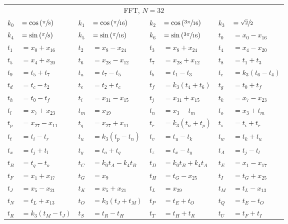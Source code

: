 \begin{tabular}{|p{4.3pt}l|p{4.3pt}l|p{4.3pt}l|p{4.3pt}l|}\toprule \multicolumn{8}{|c|}{FFT, $N=32$} \\
$k_0 $ &$= \cos\left(\sfrac{\pi}{8}\right)$ & $k_1 $ &$= \cos\left(\sfrac{\pi}{16}\right)$ & $k_2 $ &$= \cos\left(\sfrac{3\pi}{16}\right)$ & $k_3 $ &$= \sfrac{\sqrt{2}}{2}$\\ 
$k_4 $ &$= \sin\left(\sfrac{\pi}{8}\right)$ & $k_5 $ &$= \sin\left(\sfrac{\pi}{16}\right)$ & $k_6 $ &$= \sin\left(\sfrac{3\pi}{16}\right)$ & $t_0 $ &$= x_0 - x_{16}$\\ 
$t_1 $ &$= x_0 + x_{16}$ & $t_2 $ &$= x_8 - x_{24}$ & $t_3 $ &$= x_8 + x_{24}$ & $t_4 $ &$= x_4 - x_{20}$\\ 
$t_5 $ &$= x_4 + x_{20}$ & $t_6 $ &$= x_{28} - x_{12}$ & $t_7 $ &$= x_{28} + x_{12}$ & $t_8 $ &$= t_1 + t_3$\\ 
$t_9 $ &$= t_5 + t_7$ & $t_a $ &$= t_7 - t_5$ & $t_b $ &$= t_1 - t_3$ & $t_c $ &$= k_3(t_6 - t_4)$\\ 
$t_d $ &$= t_c - t_2$ & $t_e $ &$= t_2 + t_c$ & $t_f $ &$= k_3(t_4 + t_6)$ & $t_g $ &$= t_0 + t_f$\\ 
$t_h $ &$= t_0 - t_f$ & $t_i $ &$= x_{31} - x_{15}$ & $t_j $ &$= x_{31} + x_{15}$ & $t_k $ &$= x_7 - x_{23}$\\ 
$t_l $ &$= x_7 + x_{23}$ & $t_m $ &$= x_{19}$ & $t_n $ &$= x_3 - t_m$ & $t_o $ &$= x_3 + t_m$\\ 
$t_p $ &$= x_{27} - x_{11}$ & $t_q $ &$= x_{27} + x_{11}$ & $t_r $ &$= k_3(t_n + t_p)$ & $t_s $ &$= t_i + t_r$\\ 
$t_t $ &$= t_i - t_r$ & $t_u $ &$= k_3(t_p - t_n)$ & $t_v $ &$= t_u - t_k$ & $t_w $ &$= t_k + t_u$\\ 
$t_x $ &$= t_j + t_l$ & $t_y $ &$= t_o + t_q$ & $t_z $ &$= t_x - t_y$ & $t_A $ &$= t_j - t_l$\\ 
$t_B $ &$= t_q - t_o$ & $t_C $ &$= k_0t_A - k_4t_B$ & $t_D $ &$= k_0t_B + k_4t_A$ & $t_E $ &$= x_1 - x_{17}$\\ 
$t_F $ &$= x_1 + x_{17}$ & $t_G $ &$= x_9$ & $t_H $ &$= t_G - x_{25}$ & $t_I $ &$= t_G + x_{25}$\\ 
$t_J $ &$= x_5 - x_{21}$ & $t_K $ &$= x_5 + x_{21}$ & $t_L $ &$= x_{29}$ & $t_M $ &$= t_L - x_{13}$\\ 
$t_N $ &$= t_L + x_{13}$ & $t_O $ &$= k_3(t_J + t_M)$ & $t_P $ &$= t_E + t_O$ & $t_Q $ &$= t_E - t_O$\\ 
$t_R $ &$= k_3(t_M - t_J)$ & $t_S $ &$= t_R - t_H$ & $t_T $ &$= t_H + t_R$ & $t_U $ &$= t_F + t_I$\\ 

\end{tabular}
